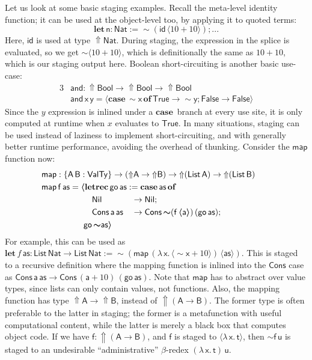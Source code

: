 \documentclass[acmsmall,screen,review,anonymous]{acmart}
\newcommand{\mit}[1]{{\mathsf{#1}}}
\newcommand{\msf}[1]{{\mathsf{#1}}}
\newcommand{\mbf}[1]{{\mathbf{#1}}}
\newcommand{\bs}[1]{\boldsymbol{#1}}
\newcommand{\ind}{\hspace{1em}}
\newcommand{\lam}{\lambda\,}
\newcommand{\letrec}{\mbf{letrec}\,}
\newcommand{\of}{\mbf{of}\,}
\newcommand{\go}{\mit{go}}
\newcommand{\letdef}{\mbf{let\,}}
\newcommand{\map}{\mit{map}}
\newcommand{\vas}{\mathsf{as}}
\newcommand{\vn}{\mathsf{n}}
\newcommand{\vA}{\mathsf{A}}
\newcommand{\vB}{\mathsf{B}}
\newcommand{\va}{\mathsf{a}}
\newcommand{\vx}{\mathsf{x}}
\newcommand{\vy}{\mathsf{y}}
\newcommand{\vf}{\mathsf{f}}
\newcommand{\vt}{\mathsf{t}}
\newcommand{\vu}{\mathsf{u}}
\newcommand{\List}{\msf{List}}
\newcommand{\Nil}{\msf{Nil}}
\newcommand{\Cons}{\msf{Cons}}
\newcommand{\Bool}{\msf{Bool}}
\newcommand{\case}{\mbf{case\,}}
\newcommand{\Lift}{{\Uparrow}}
\newcommand{\Up}{{\Uparrow}}
\newcommand{\spl}{{\bs{\sim}}}
\newcommand{\ql}{{\bs{\langle}}}
\newcommand{\qr}{{\bs{\rangle}}}
\newcommand{\VTy}{\msf{ValTy}}
\newcommand{\True}{\msf{True}}
\newcommand{\False}{\msf{False}}
\newcommand{\Nat}{\msf{Nat}}
\theoremstyle{remark}
\newcommand{\id}{\mit{id}}
\newcommand{\qt}[1]{\ql#1\qr}
\begin{document}
Let us look at some basic staging examples. Recall the meta-level identity
function; it can be used at the object-level too, by applying it to quoted
terms:
  \[ \letdef \vn : \Nat := \spl(\id\,\ql 10 + 10 \qr); ... \]
Here, $\id$ is used at type $\Lift \Nat$. During staging, the expression in the
splice is evaluated, so we get $\spl\ql 10 + 10 \qr$, which is definitionally
the same as $10 + 10$, which is our staging output here. Boolean
short-circuiting is another basic use-case:
\begin{alignat*}{3}
  &\mit{and} : \Up\Bool \to \Up\Bool \to \Up\Bool\\
  &\mit{and}\,\vx\,\vy = \ql\case \spl \vx\,\of \True \to \spl \vy; \False \to \False\qr
\end{alignat*}
Since the $y$ expression is inlined under a $\case$ branch at every use site, it
is only computed at runtime when $x$ evaluates to $\True$. In many situations,
staging can be used instead of laziness to implement short-circuiting, and with
generally better runtime performance, avoiding the overhead of thunking. Consider
the $\map$ function now:
\begin{alignat*}{3}
  & \hspace{-5em}\mathrlap{\map : \{\vA\,\vB : \VTy\} \to (\Up \vA \to \Up \vB) \to \Up (\List\,\vA) \to \Up(\List\,\vB)}\\
  & \hspace{-5em}\mathrlap{\map\,\vf\,\vas = \ql\letrec \go\,\vas := \case \vas\,\of}\\
  & \hspace{-5em}\ind\ind\ind\ind\ind \ind\Nil             &&\to \Nil;\\
  & \hspace{-5em}\ind\ind\ind\ind\ind \ind\Cons\,\va\,\vas &&\to \Cons\,\spl(\vf\,\ql \va \qr)\,(\go\,\vas);\\
  & \hspace{-5em}\ind\ind\ind\ind\ind\go\,\spl\vas \qr
\end{alignat*}
For example, this can be used as $\letdef f\,\vas : \List\,\Nat \to \List\,\Nat
:= \spl(\map\,(\lam \vx.\,\ql \spl \vx + 10 \qr)\,\qt{\vas}) $.  This is staged to a
recursive definition where the mapping function is inlined into the $\Cons$ case
as $\Cons\,\va\,\vas \to \Cons\,(\va + 10)\,(\go\,\vas)$.  Note that $\map$ has to
abstract over value types, since lists can only contain values, not
functions. Also, the mapping function has type $\Up \vA \to \Up \vB$, instead of
$\Up (\vA \to \vB)$. The former type is often preferable to the latter in staging;
the former is a metafunction with useful computational content, while the latter
is merely a black box that computes object code. If we have $\vf : \Up(\vA \to \vB)$,
and $\vf$ is staged to $\ql \lam \vx.\,\vt\qr$, then $\spl \vf\,\vu$ is staged to an
undesirable ``administrative'' $\beta$-redex $(\lam \vx.\,\vt)\,\vu$.
\end{document}
